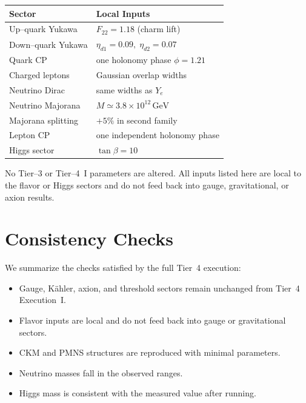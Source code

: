 \documentclass[11pt]{article}
\begin{document}
\begin{center}
\begin{tabular}{l|l}
\textbf{Sector} & \textbf{Local Inputs} \\
\hline
Up--quark Yukawa & $F_{22}=1.18$ (charm lift) \\
Down--quark Yukawa & $\eta_{d1}=0.09,\;\eta_{d2}=0.07$ \\
Quark CP & one holonomy phase $\phi=1.21$ \\
Charged leptons & Gaussian overlap widths \\
Neutrino Dirac & same widths as $Y_e$ \\
Neutrino Majorana & $M\simeq3.8\times10^{12}\,\mathrm{GeV}$ \\
Majorana splitting & $+5\%$ in second family \\
Lepton CP & one independent holonomy phase \\
Higgs sector & $\tan\beta=10$ \\
\end{tabular}
\end{center}

\begin{remark}
No Tier--3 or Tier--4~I parameters are altered.
All inputs listed here are local to the flavor or Higgs sectors and do
not feed back into gauge, gravitational, or axion results.
\end{remark}


\section{Consistency Checks}

We summarize the checks satisfied by the full Tier~4 execution:
\begin{itemize}
  \item Gauge, K\"ahler, axion, and threshold sectors remain unchanged
        from Tier~4 Execution~I.
  \item Flavor inputs are local and do not feed back into gauge or
        gravitational sectors.
  \item CKM and PMNS structures are reproduced with minimal parameters.
  \item Neutrino masses fall in the observed ranges.
  \item Higgs mass is consistent with the measured value after running.
\end{itemize}

\end{document}
